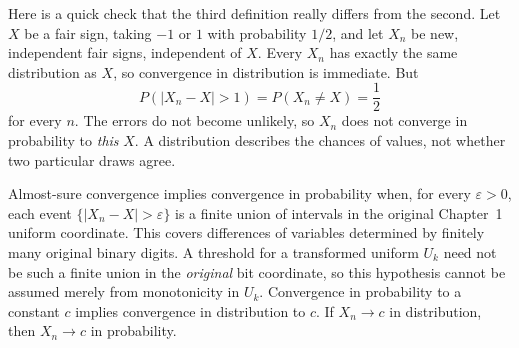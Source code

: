 Here is a quick check that the third definition really differs from the second. Let $X$ be a fair sign, taking $-1$ or $1$ with probability $1/2$, and let $X_n$ be new, independent fair signs, independent of $X$. Every $X_n$ has exactly the same distribution as $X$, so convergence in distribution is immediate. But
\[
 P(|X_n-X|>1)=P(X_n\ne X)=\frac12
\]
for every $n$. The errors do not become unlikely, so $X_n$ does not converge in probability to \emph{this} $X$. A distribution describes the chances of values, not whether two particular draws agree.

\begin{proposition}[comparisons]\label{prop:modes}
Almost-sure convergence implies convergence in probability when, for every $\varepsilon>0$, each event $\{|X_n-X|>\varepsilon\}$ is a finite union of intervals in the original Chapter~1 uniform coordinate. This covers differences of variables determined by finitely many original binary digits. A threshold for a transformed uniform $U_k$ need not be such a finite union in the \emph{original} bit coordinate, so this hypothesis cannot be assumed merely from monotonicity in $U_k$. Convergence in probability to a constant $c$ implies convergence in distribution to $c$. If $X_n\to c$ in distribution, then $X_n\to c$ in probability.
\end{proposition}
